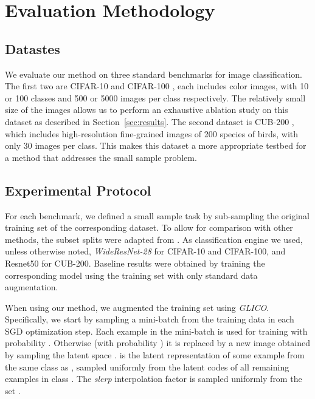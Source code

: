 \documentclass[a4paper,conference]{IEEEtran}
\begin{document}
\section{Evaluation Methodology}
\label{sec:evalution}

\subsection{Datastes}

We evaluate our method on three standard benchmarks for image classification. The first two are CIFAR-10 and CIFAR-100 \cite{cifar100}, each includes   color images, with 10 or 100 classes and 500 or 5000 images per class respectively. The relatively small size of the images allows us to perform an exhaustive ablation study on this dataset as described in Section~\ref{sec:results}. The second dataset is CUB-200 \cite{WahCUB_200_2011}, which includes high-resolution fine-grained images of 200 species of birds, with only 30 images per class. This makes this dataset a more appropriate testbed for a method that addresses the small sample problem.

		
\subsection{Experimental Protocol}
\label{sec:experiments}

For each benchmark, we defined a small sample task by sub-sampling the original training set of the corresponding dataset. To allow for comparison with other methods, the subset splits were adapted from \cite{cosinesmalldata}. As classification engine we used, unless otherwise noted, \textit{WideResNet-28} \cite{zagoruyko2016wide} for CIFAR-10 and CIFAR-100, and Resnet50 \cite{he2016deep} for CUB-200. Baseline results were obtained by training the corresponding model using the training set with only standard data augmentation. 

When using our method, we augmented the training set using \textit{GLICO}. Specifically, we start by sampling a mini-batch from the training data in each SGD optimization step. Each example  in the mini-batch is used for training with probability . Otherwise (with probability ) it is replaced by a new image obtained by sampling the latent space .  is the latent representation of some example from the same class  as , sampled uniformly from the latent codes of all remaining examples in class . The \emph{slerp} interpolation factor is sampled uniformly from the set .
\end{document}
